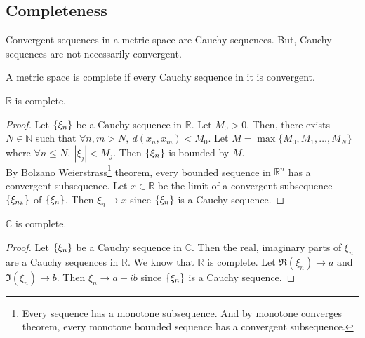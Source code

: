 \subsection{Completeness}
Convergent sequences in a metric space are Cauchy sequences. But, Cauchy sequences are not necessarily convergent.
\begin{definition}[complete]
	A metric space is complete if every Cauchy sequence in it is convergent.
\end{definition}
\begin{theorem}
	$\mathbb{R}$ is complete.
\end{theorem}
\begin{proof}
	Let $\left\{\xi_n\right\}$ be a Cauchy sequence in $\mathbb{R}$.
	Let $M_0 > 0$.
	Then, there exists $N \in \mathbb{N}$ such that $\forall n,m > N,\ d(x_n,x_m) < M_0$.
	Let $M = \max \{M_0,M_1,\dots,M_N \}$ where $\forall n \le N,\ |\xi_j| < M_j$.
	Then $\left\{\xi_n\right\}$ is bounded by $M$.\\

	By Bolzano Weierstrass\dag\footnote{
		Every sequence has a monotone subsequence.
		And by monotone converges theorem, every monotone bounded sequence has a convergent subsequence.} 
	theorem, every bounded sequence in $\mathbb{R}^n$ has a convergent subsequence.
	Let $x \in \mathbb{R}$ be the limit of a convergent subsequence $\left\{\xi_{n_k}\right\}$ of $\left\{\xi_n\right\}$.
	Then $\xi_n \to x$ since $\left\{\xi_n\right\}$ is a Cauchy sequence.
\end{proof}

\begin{theorem}
	$\mathbb{C}$ is complete.
\end{theorem}
\begin{proof}
	Let $\left\{\xi_n\right\}$ be a Cauchy sequence in $\mathbb{C}$.
	Then the real, imaginary parts of $\xi_n$ are a Cauchy sequences in $\mathbb{R}$.
	We know that $\mathbb{R}$ is complete.
	Let $\Re(\xi_n) \to a$ and $\Im(\xi_n) \to b$.
	Then $\xi_n \to a+ib$ since $\left\{\xi_n\right\}$ is a Cauchy sequence.
\end{proof}

